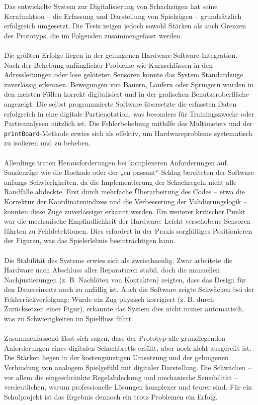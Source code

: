 \documentclass[a4paper]{article}
\begin{document}
Das entwickelte System zur Digitalisierung von Schachzügen hat seine Kernfunktion – die Erfassung und Darstellung von Spielzügen – grundsätzlich erfolgreich umgesetzt. Die Tests zeigen jedoch sowohl Stärken als auch Grenzen des Prototyps, die im Folgenden zusammengefasst werden.\\
\\
Die größten Erfolge liegen in der gelungenen Hardware-Software-Integration. Nach der Behebung anfänglicher Probleme wie Kurzschlüssen in den Adressleitungen oder lose gelöteten Sensoren konnte das System Standardzüge zuverlässig erkennen. Bewegungen von Bauern, Läufern oder Springern wurden in den meisten Fällen korrekt digitalisiert und in der grafischen Benutzeroberfläche angezeigt. Die selbst programmierte Software übersetzte die erfassten Daten erfolgreich in eine digitale Partienotation, was besonders für Trainingszwecke oder Partieanalysen nützlich ist. Die Fehlerbehebung mithilfe des Multimeters und der \texttt{printBoard}-Methode erwies sich als effektiv, um Hardwareprobleme systematisch zu isolieren und zu beheben.\\
\\
Allerdings traten Herausforderungen bei komplexeren Anforderungen auf. Sonderzüge wie die Rochade oder der „en passant“-Schlag bereiteten der Software anfangs Schwierigkeiten, da die Implementierung der Schachregeln nicht alle Randfälle abdeckte. Erst durch mehrfache Überarbeitung des Codes – etwa die Korrektur der Koordinatenindizes und die Verbesserung der Validierungslogik – konnten diese Züge zuverlässiger erkannt werden. Ein weiterer kritischer Punkt war die mechanische Empfindlichkeit der Hardware: Leicht verschobene Sensoren führten zu Fehldetektionen. Dies erfordert in der Praxis sorgfältiges Positionieren der Figuren, was das Spielerlebnis beeinträchtigen kann.\\
\\
Die Stabilität des Systems erwies sich als zweischneidig. Zwar arbeitete die Hardware nach Abschluss aller Reparaturen stabil, doch die manuellen Nachjustierungen (z. B. Nachlöten von Kontakten) zeigten, dass das Design für den Dauereinsatz noch zu anfällig ist. Auch die Software zeigte Schwächen bei der Fehlerrückverfolgung: Wurde ein Zug physisch korrigiert (z. B. durch Zurücksetzen einer Figur), erkannte das System dies nicht immer automatisch, was zu Schwierigkeiten im Spielfluss führt\\
\\
Zusammenfassend lässt sich sagen, dass der Prototyp alle grundlegenden Anforderungen eines digitalen Schachbretts erfüllt, aber noch nicht ausgereift ist. Die Stärken liegen in der kostengünstigen Umsetzung und der gelungenen Verbindung von analogem Spielgefühl mit digitaler Darstellung. Die Schwächen – vor allem die eingeschränkte Regelabdeckung und mechanische Sensibilität – verdeutlichen, warum professionelle Lösungen komplexer und teurer sind. Für ein Schulprojekt ist das Ergebnis dennoch ein trotz Problemen ein Erfolg.
\end{document}
